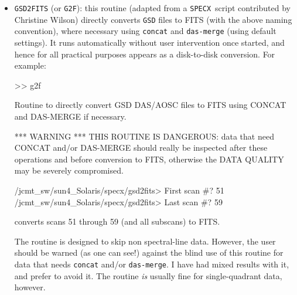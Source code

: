 \documentclass[11pt,twoside]{starlink}
\providecommand{\SPECX}{\texttt{SPECX}}
\providecommand{\SP}{{$>\!>$}}
\begin{document}
\begin{itemize}
If one chooses to imprint the filenames with the sequence number in
the \SPECX\ input data file, the subscan number is omitted: file names
will look like
\verb|jcmt_nnnn.fits|.

In both cases it will be useful to make a print-out of the input file
using

\SP \verb|s-l-f f file.list|\\
\SP \verb|in-f 1 l|\\
\SP \verb|s-l-f t|

for example. In this case a complete (`long') listing of the \SPECX\
input file number 1 is produced in \texttt{file.list}.

To avoid digitization problems when converting FITS \texttt{I4} integers
\texttt{tofits} clips the data intensity values $I$ to be within the
range $-500 < I < +500$. The routine now also tells where it sits, so
that one can copy and edit the procedure in case one wants to change
the thresholds.

\item
\texttt{GSD2FITS} (or \texttt{G2F}): this routine (adapted from a \SPECX\
script contributed by Christine Wilson) directly converts \texttt{GSD}
files to FITS (with the above naming convention), where necessary
using \texttt{concat} and \texttt{das-merge} (using default settings). It
runs automatically without user intervention once started, and hence
for all practical purposes appears as a disk-to-disk conversion.  For
example:

\begin{terminalv}
 >> g2f

 Routine to directly convert GSD DAS/AOSC files to FITS using CONCAT
 and DAS-MERGE if necessary.

 *** WARNING *** THIS ROUTINE IS DANGEROUS: data that need CONCAT
 and/or DAS-MERGE should really be inspected after these operations
 and before conversion to FITS, otherwise the DATA QUALITY may be
 severely compromised.

 /jcmt_sw/sun4_Solaris/specx/gsd2fits> First scan #? 51
 /jcmt_sw/sun4_Solaris/specx/gsd2fits> Last scan #? 59

\end{terminalv}

converts scans 51 through 59 (and all subscans) to FITS.

The routine is designed to skip non spectral-line data. However, the
user should be warned (as one can see!) against the blind use of this
routine for data that needs \texttt{concat} and/or \texttt{das-merge}. I
have had mixed results with it, and prefer to avoid it. The
routine \textit{is} usually fine for single-quadrant data, however.
\end{itemize}
\end{document}
